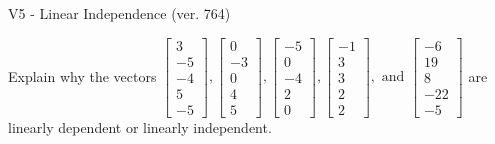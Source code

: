 \begin{exercise}
  \begin{exerciseTitle}V5 - Linear Independence (ver. 764)\end{exerciseTitle}
  \begin{exerciseStatement}
    Explain why the vectors \(\left[\begin{array}{r}
3 \\
-5 \\
-4 \\
5 \\
-5
\end{array}\right] , \left[\begin{array}{r}
0 \\
-3 \\
0 \\
4 \\
5
\end{array}\right] , \left[\begin{array}{r}
-5 \\
0 \\
-4 \\
2 \\
0
\end{array}\right] , \left[\begin{array}{r}
-1 \\
3 \\
3 \\
2 \\
2
\end{array}\right] , \text{ and } \left[\begin{array}{r}
-6 \\
19 \\
8 \\
-22 \\
-5
\end{array}\right]\) are linearly dependent or linearly independent.	



\end{exerciseStatement}
\end{exercise}
